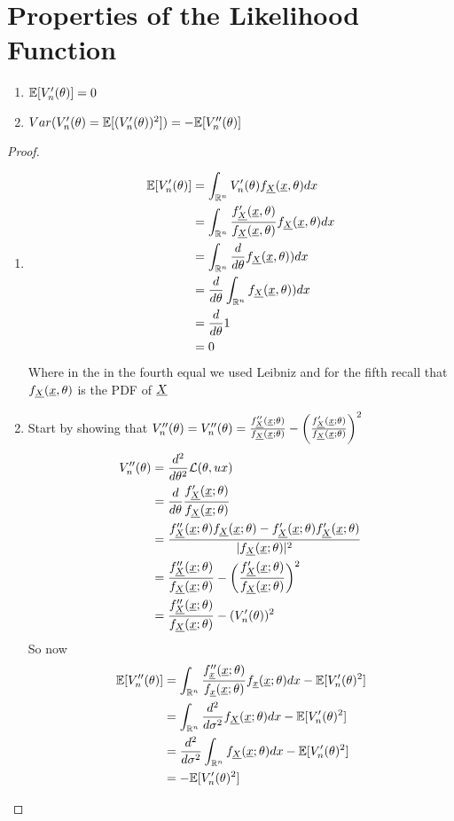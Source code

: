 \section{Properties of the Likelihood Function}
\begin{prop}
	\begin{enumerate}Some properties of the score function \ref{defi:scoref} are:
		\item $\mathbb{E}[V_n'(\theta)]=0$
		\item $Var(V_n'(\theta)=\mathbb{E}[(V_n'(\theta))^2])=- \mathbb{E}[V_n''(\theta)]$
	\end{enumerate}
\end{prop}
\begin{proof}
	\begin{enumerate}
		\item 
		\[
			\begin{split}
			\mathbb{E}[V_n'(\theta)]
			&=\int_{\mathbb{R}^n} V_n'(\theta)f_{\underline X}(\underline x, \theta) dx\\
			&=\int_{\mathbb{R}^n}\frac{f_{\underline X}'(\underline x, \theta)}{f_{\underline X}(\underline x, \theta)}f_{\underline X}(\underline x, \theta)dx\\
			&=\int_{\mathbb{R}^n} \frac{d}{d\theta}f_{\underline X}(\underline x, \theta))dx\\
			&= \frac{d}{d\theta}\int_{\mathbb{R}^n}f_{\underline X}(\underline x, \theta))dx\\
			&= \frac{d}{d\theta} 1\\
			&=0
			\end{split}
		\]
		Where in the in the fourth equal we used Leibniz and for the fifth recall that $f_{\underline X}(\underline x, \theta)$ is the PDF of $\underline X$
		\item Start by showing that $V_n''(\theta)=V_n''(\theta)=\frac{f_{\underline X}''(\underline x;\theta)}{f_{\underline X}(\underline x;\theta)}-\bigg( \frac{f_{\underline X}'(\underline x;\theta)}{f_{\underline X}(\underline x;\theta)} \bigg)^2$
		\[
		\begin{split}
		V_n''(\theta)
		&=\frac{d^2}{d \theta^2} \mathcal{L}(\theta,ux)\\
		&=\frac{d}{d\theta}\frac{f_{\underline X}'(\underline x;\theta)}{f_{\underline X}(\underline x;\theta)}\\
		&=\frac{f_{\underline X}''(\underline x;\theta)f_{\underline X}(\underline x;\theta)-f_{\underline X}'(\underline x;\theta)f_{\underline X}'(\underline x;\theta)}{|f_{\underline X}(\underline x;\theta)|^2}\\
		&=\frac{f_{\underline X}''(\underline x;\theta)}{f_{\underline X}(\underline x;\theta)}-\bigg( \frac{f_{\underline X}'(\underline x;\theta)}{f_{\underline X}(\underline x;\theta)} \bigg)^2\\
		&=\frac{f_{\underline X}''(\underline x;\theta)}{f_{\underline X}(\underline x;\theta)}-(V_n'(\theta))^2
		\end{split}		
		\]
		So now
		\[
		\begin{split}
			\mathbb{E}[V_n''(\theta)]
			&=\int_{\mathbb{R}^n}\frac{f_{\underline x}''(\underline x;\theta)}{f_{\underline x}(\underline x;\theta)}f_{\underline x}(\underline x;\theta)dx-\mathbb{E}[V_n'(\theta)^2]\\
			&=\int_{\mathbb{R}^n}\frac{d^2}{d\sigma^2}f_{\underline X}(\underline x;\theta)dx-\mathbb{E}[V_n'(\theta)^2]\\
			&=\frac{d^2}{d\sigma^2}\int_{\mathbb{R}^n}f_{\underline X}(\underline x;\theta)dx-\mathbb{E}[V_n'(\theta)^2]\\
			&=-\mathbb{E}[V_n'(\theta)^2]
		\end{split}
		\]
	\end{enumerate}
\end{proof}

